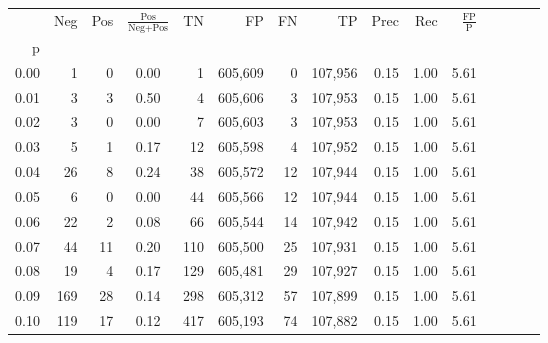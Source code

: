 \begin{tabular}{rrrcrrrrrrrrrrr}
\toprule
{} &      Neg &     Pos & $\frac{\text{Pos}}{\text{Neg}+\text{Pos}}$ &       TN &       FP &       FN &       TP &  Prec &   Rec & $\frac{\text{FP}}{\text{P}}$ \\
p    &          &         &                                            &          &          &          &          &       &       &                              \\
\midrule
0.00 &        1 &       0 &                                       0.00 &        1 &  605,609 &        0 &  107,956 &  0.15 &  1.00 &                         5.61 \\
0.01 &        3 &       3 &                                       0.50 &        4 &  605,606 &        3 &  107,953 &  0.15 &  1.00 &                         5.61 \\
0.02 &        3 &       0 &                                       0.00 &        7 &  605,603 &        3 &  107,953 &  0.15 &  1.00 &                         5.61 \\
0.03 &        5 &       1 &                                       0.17 &       12 &  605,598 &        4 &  107,952 &  0.15 &  1.00 &                         5.61 \\
0.04 &       26 &       8 &                                       0.24 &       38 &  605,572 &       12 &  107,944 &  0.15 &  1.00 &                         5.61 \\
0.05 &        6 &       0 &                                       0.00 &       44 &  605,566 &       12 &  107,944 &  0.15 &  1.00 &                         5.61 \\
0.06 &       22 &       2 &                                       0.08 &       66 &  605,544 &       14 &  107,942 &  0.15 &  1.00 &                         5.61 \\
0.07 &       44 &      11 &                                       0.20 &      110 &  605,500 &       25 &  107,931 &  0.15 &  1.00 &                         5.61 \\
0.08 &       19 &       4 &                                       0.17 &      129 &  605,481 &       29 &  107,927 &  0.15 &  1.00 &                         5.61 \\
0.09 &      169 &      28 &                                       0.14 &      298 &  605,312 &       57 &  107,899 &  0.15 &  1.00 &                         5.61 \\
0.10 &      119 &      17 &                                       0.12 &      417 &  605,193 &       74 &  107,882 &  0.15 &  1.00 &                         5.61 \\

\end{tabular}
